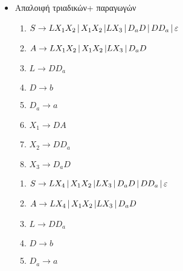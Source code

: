 \begin{tcolorbox}[colback=yellow!15!white, colframe=blue!50!white,
	fonttitle=\bfseries\Large, title = Μετατροπή $CFG\rightarrow CNF$ 3/3]

	\begin{itemize}
			\item Απαλοιφή τριαδικών+ παραγωγών
	\reducevspace\reducevspace\reducevspace\reducevspace\reducevspace\reducevspace\reducevspace

	\begin{minipage}[t]{0.5\textwidth}
		\begin{enumerate}
			\item $S\rightarrow LX_1X_2 \,|\, X_1X_2 \,|\\
			LX_3 \,|\, D_aD \,|\, DD_a \,|\, \varepsilon$

			\item $A\rightarrow LX_1X_2 \,|\, X_1X_2 \,|\\
			LX_3 \,|\, D_aD$

			\item $L\rightarrow DD_a$

			\item $D\rightarrow b$

			\item $D_a\rightarrow a$

			\item $X_1\rightarrow DA$

			\item $X_2\rightarrow DD_a$

			\item $X_3\rightarrow D_aD$
		\end{enumerate}
	\end{minipage}%
	\hfill
	\begin{minipage}[t]{0.5\textwidth}
		\begin{enumerate}
			\item $S\rightarrow LX_4 \,|\, X_1X_2 \,|\\
			LX_3 \,|\, D_aD \,|\, DD_a \,|\, \varepsilon$

			\item $A\rightarrow LX_4 \,|\, X_1X_2 \,|\\
			LX_3 \,|\, D_aD$

			\item $L\rightarrow DD_a$

			\item $D\rightarrow b$

			\item $D_a\rightarrow a$


\end{enumerate}
\end{minipage}
\end{itemize}
\end{tcolorbox}
